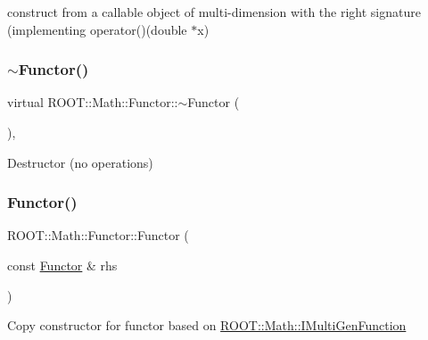 construct from a callable object of multi-\/dimension with the right signature (implementing operator()(double $\ast$x) \mbox{\label{classROOT_1_1Math_1_1Functor_a349935f827a453deb17fdad728849028}} 
\subsubsection{\texorpdfstring{$\sim$Functor()}{~Functor()}\hspace{0.1cm}{\footnotesize\ttfamily [2/3]}}
{\footnotesize\ttfamily virtual R\+O\+O\+T\+::\+Math\+::\+Functor\+::$\sim$\+Functor (\begin{DoxyParamCaption}{ }\end{DoxyParamCaption})\hspace{0.3cm}{\ttfamily [inline]}, {\ttfamily [virtual]}}

Destructor (no operations) \mbox{\label{classROOT_1_1Math_1_1Functor_a001bfe27e95032f05685167e77e0efbd}} 
\subsubsection{\texorpdfstring{Functor()}{Functor()}\hspace{0.1cm}{\footnotesize\ttfamily [8/12]}}
{\footnotesize\ttfamily R\+O\+O\+T\+::\+Math\+::\+Functor\+::\+Functor (\begin{DoxyParamCaption}\item[{const \mbox{\hyperlink{classROOT_1_1Math_1_1Functor}{Functor}} \&}]{rhs }\end{DoxyParamCaption})\hspace{0.3cm}{\ttfamily [inline]}}

Copy constructor for functor based on \mbox{\hyperlink{namespaceROOT_1_1Math_aec22897f3d759f7c284893c81d980799}{R\+O\+O\+T\+::\+Math\+::\+I\+Multi\+Gen\+Function}} \mbox{\label{classROOT_1_1Math_1_1Functor_a2330648eca94b53b3ba613e49d03927f}} 

